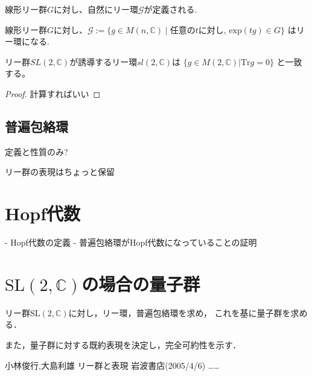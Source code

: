 \documentclass{ujarticle}
\begin{document}
線形リー群$G$に対し、自然にリー環$\mathcal{G}$が定義される.
\begin{prop}
 線形リー群$G$に対し、$\mathcal{G}:=\{g \in M(n,\mathbb{C})\mid $任意の$t$に対し,
 $\mathrm{exp}(tg) \in G\}$ はリー環になる.
\end{prop}

\begin{epl}
リー群$SL(2,\mathbb{C})$が誘導するリー環$sl(2,\mathbb{C})$は
$\{ g \in M(2,\mathbb{C}) | \mathrm{Tr}g = 0 \}$
と一致する。
\end{epl}
\begin{proof}
 計算すればいい
\end{proof}

\subsection{普遍包絡環}
\label{sub:普遍包絡環}

定義と性質のみ?


リー群の表現はちょっと保留


\section{Hopf代数}
\label{sub:Hopf代数}

- Hopf代数の定義
- 普遍包絡環がHopf代数になっていることの証明

\section{$\mathrm{SL}(2,\mathbb{C})$の場合の量子群}

リー群$\mathrm{SL}(2,\mathbb{C})$に対し，リー環，普遍包絡環を求め，
これを基に量子群を求める．

また，量子群に対する既約表現を決定し，完全可約性を示す．


\begin{thebibliography}{99}
   小林俊行,大島利雄 リー群と表現 岩波書店(2005/4/6)
    ……
\end{thebibliography}
\end{document}

